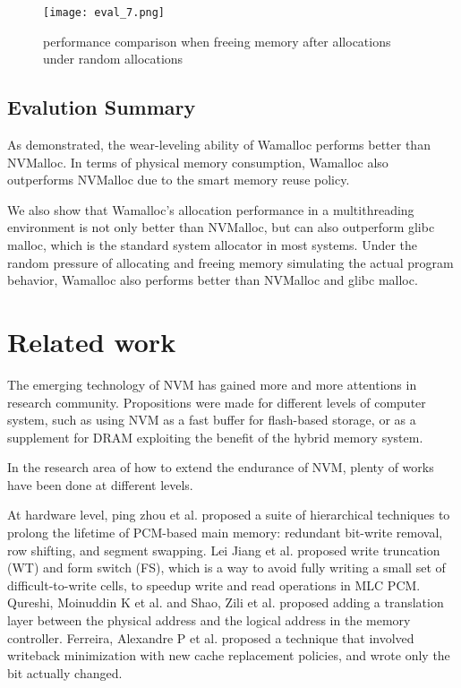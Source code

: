 \documentclass[10pt, conference, compsocconf]{IEEEtran}
\begin{document}
\begin{figure}[t]
\centering
\texttt{[image: eval\_7.png]}
\caption{performance comparison when freeing memory after allocations under random allocations}
\label{fig:eval_7}
\end{figure}

\subsection{Evalution Summary}

As demonstrated, 
the wear-leveling ability of Wamalloc performs better than NVMalloc.
In terms of physical memory consumption, Wamalloc also outperforms NVMalloc
due to the smart memory reuse policy.

We also show that Wamalloc's allocation performance in a multithreading environment is not only better than NVMalloc,
but can also outperform glibc malloc, which is the standard system allocator in most systems.
Under the random pressure of allocating and freeing memory simulating the actual program behavior,
Wamalloc also performs better than NVMalloc and glibc malloc.

\section{Related work}

The emerging technology of NVM has gained more and more attentions in research community.
Propositions were made for different levels of computer system, 
such as using NVM as a fast buffer for flash-based storage\cite{greenan2007prims}, 
or as a supplement for DRAM exploiting the benefit of the hybrid memory system.

In the research area of how to extend the endurance of NVM,
plenty of works have been done at different levels.

At hardware level, ping zhou et al.\cite{zhou2009durable} proposed a suite of hierarchical techniques to
prolong the lifetime of PCM-based main memory: 
redundant bit-write removal, row shifting, and segment swapping.
Lei Jiang et al.\cite{jiang2012improving} proposed write truncation (WT) and form switch (FS),
which is a way to avoid fully writing a small set of difficult-to-write cells, to speedup write and read operations in MLC PCM.
Qureshi, Moinuddin K et al.\cite{qureshi2009enhancing} and Shao, Zili et al.\cite{shao2012ptl} proposed adding a translation layer
between the physical address and the logical address in the memory controller.
Ferreira, Alexandre P et al.\cite{ferreira2010increasing} proposed a technique that involved 
writeback minimization with new cache replacement policies, and wrote only the bit actually changed.
\end{document}
